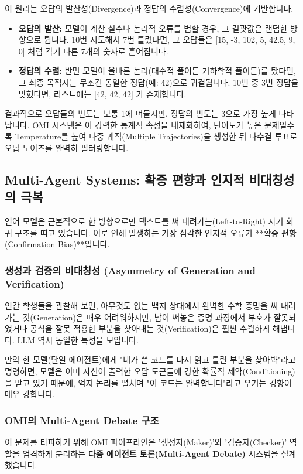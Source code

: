 이 원리는 오답의 발산성(Divergence)과 정답의 수렴성(Convergence)에 기반합니다.
\begin{itemize}
    \item \textbf{오답의 발산:} 모델이 계산 실수나 논리적 오류를 범할 경우, 그 결괏값은 랜덤한 방향으로 튑니다. 10번 시도해서 7번 틀렸다면, 그 오답들은 [15, -3, 102, 5, 42.5, 9, 0] 처럼 각기 다른 7개의 숫자로 흩어집니다.
    \item \textbf{정답의 수렴:} 반면 모델이 올바른 논리(대수적 풀이든 기하학적 풀이든)를 탔다면, 그 최종 목적지는 무조건 동일한 정답(예: 42)으로 귀결됩니다. 10번 중 3번 정답을 맞혔다면, 리스트에는 [42, 42, 42] 가 존재합니다.
\end{itemize}
결과적으로 오답들의 빈도는 보통 1에 머물지만, 정답의 빈도는 3으로 가장 높게 나타납니다. OMI 시스템은 이 강력한 통계적 속성을 내재화하여, 난이도가 높은 문제일수록 Temperature를 높여 다중 궤적(Multiple Trajectories)을 생성한 뒤 다수결 투표로 오답 노이즈를 완벽히 필터링합니다.

\subsection{Multi-Agent Systems: 확증 편향과 인지적 비대칭성의 극복}
언어 모델은 근본적으로 한 방향으로만 텍스트를 써 내려가는(Left-to-Right) 자기 회귀 구조를 띠고 있습니다. 이로 인해 발생하는 가장 심각한 인지적 오류가 **확증 편향(Confirmation Bias)**입니다. 

\subsubsection{생성과 검증의 비대칭성 (Asymmetry of Generation and Verification)}
인간 학생들을 관찰해 보면, 아무것도 없는 백지 상태에서 완벽한 수학 증명을 써 내려가는 것(Generation)은 매우 어려워하지만, 남이 써놓은 증명 과정에서 부호가 잘못되었거나 공식을 잘못 적용한 부분을 찾아내는 것(Verification)은 훨씬 수월하게 해냅니다. LLM 역시 동일한 특성을 보입니다.

만약 한 모델(단일 에이전트)에게 "네가 쓴 코드를 다시 읽고 틀린 부분을 찾아봐"라고 명령하면, 모델은 이미 자신이 출력한 오답 토큰들에 강한 확률적 제약(Conditioning)을 받고 있기 때문에, 억지 논리를 펼치며 "이 코드는 완벽합니다"라고 우기는 경향이 매우 강합니다.

\subsubsection{OMI의 Multi-Agent Debate 구조}
이 문제를 타파하기 위해 OMI 파이프라인은 '생성자(Maker)'와 '검증자(Checker)' 역할을 엄격하게 분리하는 \textbf{다중 에이전트 토론(Multi-Agent Debate)} 시스템을 설계했습니다. 

